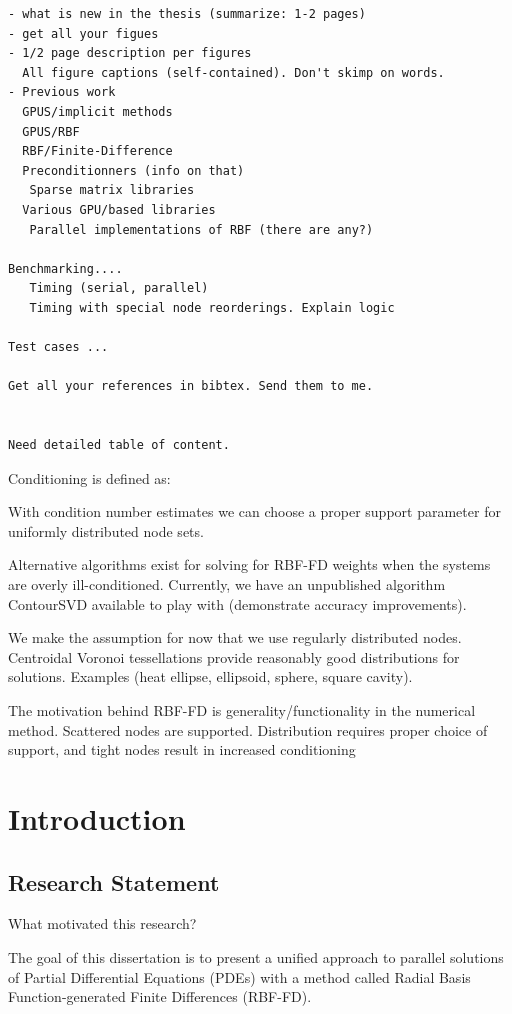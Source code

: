 
\begin{verbatim}
- what is new in the thesis (summarize: 1-2 pages)
- get all your figues
- 1/2 page description per figures
  All figure captions (self-contained). Don't skimp on words.
- Previous work
  GPUS/implicit methods
  GPUS/RBF
  RBF/Finite-Difference
  Preconditionners (info on that)
   Sparse matrix libraries
  Various GPU/based libraries
   Parallel implementations of RBF (there are any?)

Benchmarking....
   Timing (serial, parallel)
   Timing with special node reorderings. Explain logic

Test cases ...

Get all your references in bibtex. Send them to me.


Need detailed table of content.
\end{verbatim}

Conditioning is defined as: 

With condition number estimates we can choose a proper support parameter for uniformly distributed node sets.

Alternative algorithms exist for solving for RBF-FD weights when the systems are overly ill-conditioned. Currently, we have an unpublished algorithm ContourSVD available to play with (demonstrate accuracy improvements). 

We make the assumption for now that we use regularly distributed nodes. Centroidal Voronoi tessellations provide reasonably good distributions for solutions. Examples (heat ellipse, ellipsoid, sphere, square cavity).

The motivation behind RBF-FD is generality/functionality in the numerical method. Scattered nodes are supported. Distribution requires proper choice of support, and tight nodes result in increased conditioning


\chapter{Introduction}

\section{Research Statement} 
What motivated this research?
\label{sec:intro}

The goal of this dissertation is to present a unified approach
to parallel solutions of Partial Differential Equations (PDEs)
with a method called Radial Basis Function-generated Finite
Differences (RBF-FD).

